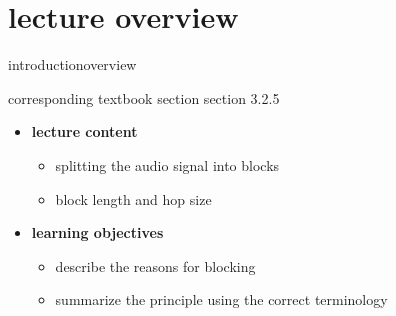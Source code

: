 


\subtitle{Module 3.2.5: Fundamentals~---~Blocking}


	

    \section[overview]{lecture overview}
        \begin{frame}{introduction}{overview}
            \begin{block}{corresponding textbook section}
                section 3.2.5
            \end{block}

            \begin{itemize}
                \item   \textbf{lecture content}
                    \begin{itemize}
                        \item   splitting the audio signal into blocks
                        \item   block length and hop size
                    \end{itemize}
                \bigskip
                \item<2->   \textbf{learning objectives}
                    \begin{itemize}
                        \item   describe the reasons for blocking
                        \item   summarize the principle using the correct terminology
                    \end{itemize}
            \end{itemize}
        \end{frame}

